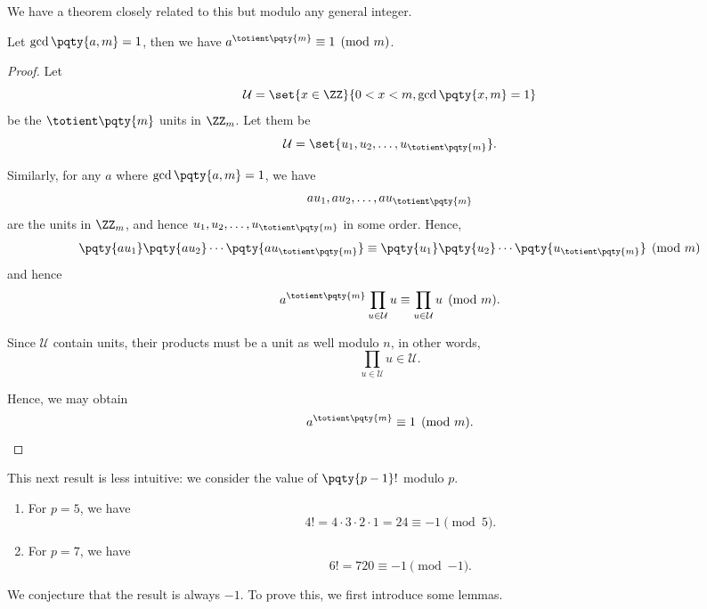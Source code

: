 We have a theorem closely related to this but modulo any general integer.

\begin{theorem}
    Let \(\gcd\pqty{a, m} = 1\), then we have \(a^{\totient\pqty{m}} \equiv 1 \pmod{m}\).
\end{theorem}

\begin{proof}
    Let
    \[
        \mathcal{U} = \set{x \in \ZZ}{0 < x < m, \gcd\pqty{x, m} = 1}
    \]
    be the \(\totient\pqty{m}\) units in \(\ZZ_{m}\). Let them be
    \[
        \mathcal{U} = \set{u_1, u_2, \ldots, u_{\totient\pqty{m}}}.
    \]

    Similarly, for any \(a\) where \(\gcd\pqty{a, m} = 1\), we have
    \[
        a u_1, a u_2, \ldots, a u_{\totient\pqty{m}}
    \]
    are the units in \(\ZZ_m\), and hence \(u_1, u_2, \ldots, u_{\totient\pqty{m}}\) in some order. Hence,
    \[
        \pqty{a u_1} \pqty{a u_2} \cdots \pqty{a u_{\totient\pqty{m}}} \equiv \pqty{u_1} \pqty{u_2} \cdots \pqty{u_{\totient\pqty{m}}} \pmod{m}
    \]
    and hence
    \[
        a^{\totient \pqty{m}} \prod_{u \in \mathcal{U}} u \equiv \prod_{u \in \mathcal{U}} u \pmod{m}.
    \]

    Since \(\mathcal{U}\) contain units, their products must be a unit as well modulo \(n\), in other words,
    \[
        \prod_{u \in \mathcal{U}} u \in \mathcal{U}.
    \]

    Hence, we may obtain
    \[
        a^{\totient\pqty{m}} \equiv 1 \pmod{m}.
    \]
\end{proof}

This next result is less intuitive: we consider the value of \(\pqty{p - 1}!\) modulo \(p\).

\begin{examples}
    \begin{enumerate}
        \item For \(p = 5\), we have
        \[
            4! = 4 \cdot 3 \cdot 2 \cdot 1 = 24 \equiv -1 \pmod{5}.
        \]

        \item For \(p = 7\), we have
        \[
            6! = 720 \equiv -1 \pmod{-1}.
        \]
    \end{enumerate}
\end{examples}

We conjecture that the result is always \(-1\). To prove this, we first introduce some lemmas.

